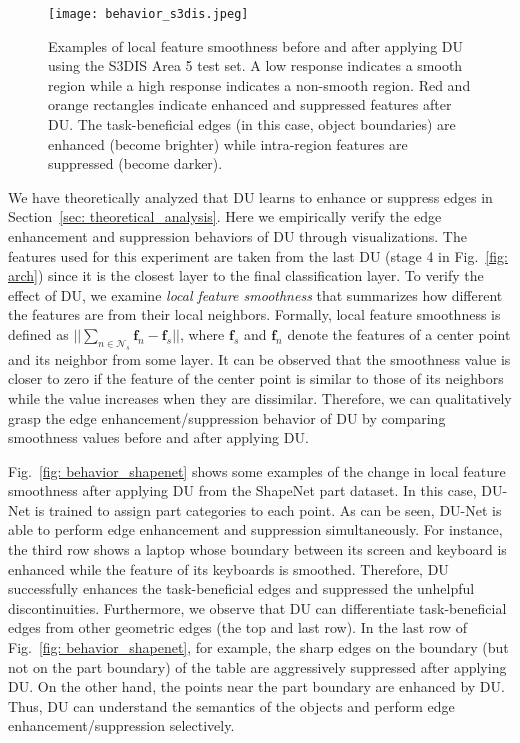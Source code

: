 \documentclass[a4paper,fleqn]{cas-dc}
\begin{document}
\begin{figure*}[t]
    \centering 
        \texttt{[image: behavior\_s3dis.jpeg]}
    \caption{Examples of local feature smoothness before and after applying DU using the S3DIS Area 5 test set. A low response indicates a smooth region while a high response indicates a non-smooth region. Red and orange rectangles indicate enhanced and suppressed features after DU.
    The task-beneficial edges (in this case, object boundaries) are enhanced (become brighter) while intra-region features are suppressed (become darker). 
}
    \label{fig: behavior_s3dis}
\end{figure*}
We have theoretically analyzed that DU learns to enhance or suppress edges in Section~\ref{sec: theoretical_analysis}. Here we empirically verify the edge enhancement and suppression behaviors of DU through visualizations. The features used for this experiment are taken from the last DU (stage 4 in Fig.~\ref{fig: arch}) since it is the closest layer to the final classification layer. To verify the effect of DU, we examine \textit{local feature smoothness} that summarizes how different the features are from their local neighbors. 
Formally, local feature smoothness is defined as
$||\sum_{n\in\mathcal{N}_s}\textbf{f}_n - \textbf{f}_s||$, where $\textbf{f}_s$ and $\textbf{f}_n$ denote the features of a center point and its neighbor from some layer. It can be observed that the smoothness value is closer to zero if the feature of the center point is similar to those of its neighbors while the value increases when they are dissimilar. Therefore, we can qualitatively grasp the edge enhancement/suppression behavior of DU by comparing smoothness values before and after applying DU. 


Fig.~\ref{fig: behavior_shapenet} shows some examples of the change in local feature smoothness after applying DU from the ShapeNet part dataset. In this case, DU-Net is trained to assign part categories to each point. 
As can be seen, DU-Net is able to perform edge enhancement and suppression simultaneously. For instance, the third row shows a laptop whose boundary between its screen and keyboard is enhanced while the feature of its keyboards is smoothed. Therefore, DU successfully enhances the task-beneficial edges and suppressed the unhelpful discontinuities. 
Furthermore, we observe that DU can differentiate task-beneficial edges from other geometric edges (the top and last row). In the last row of Fig.~\ref{fig: behavior_shapenet}, for example, the sharp edges on the boundary (but not on the part boundary) of the table are aggressively suppressed after applying DU. On the other hand, the points near the part boundary are enhanced by DU. Thus, DU can understand the semantics of the objects and perform edge enhancement/suppression selectively.
\end{document}

